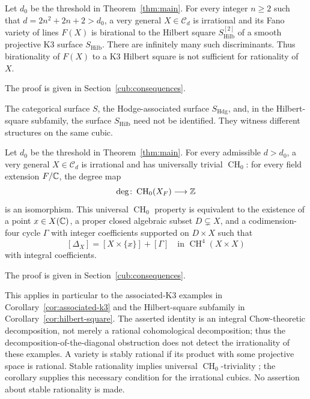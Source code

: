\begin{corollary}\label{cor:hilbert-square}
Let \(d_0\) be the threshold in Theorem~\ref{thm:main}. For every integer
\(n\ge2\) such that \(d=2n^2+2n+2>d_0\), a very general
\(X\in\mathcal C_d\) is irrational and its Fano variety of lines \(F(X)\)
is birational to the Hilbert square \(S_{\mathrm{Hilb}}^{[2]}\) of a smooth
projective K3 surface \(S_{\mathrm{Hilb}}\). There are infinitely many such
discriminants. Thus birationality of \(F(X)\) to a K3 Hilbert square is
not sufficient for rationality of \(X\).
\end{corollary}

The proof is given in Section~\ref{cub:consequences}.

The categorical surface \(S\), the Hodge-associated surface
\(S_{\mathrm{Hdg}}\), and, in the Hilbert-square subfamily, the surface
\(S_{\mathrm{Hilb}}\) need not be identified. They witness different
structures on the same cubic.

\begin{corollary}
\label{cor:chow-diagonal}
Let \(d_0\) be the threshold in Theorem~\ref{thm:main}. For every admissible
\(d>d_0\), a very general \(X\in\mathcal C_d\) is irrational and has
universally trivial \(\operatorname{CH}_0\): for every field extension
\(F/\mathbb C\), the degree map
\[
 \deg\colon\operatorname{CH}_0(X_F)\longrightarrow\mathbb Z
\]
is an isomorphism. This universal \(\operatorname{CH}_0\) property is
equivalent to the existence of a point \(x\in X(\mathbb C)\), a proper closed
algebraic subset \(D\subsetneq X\), and a codimension-four cycle \(\Gamma\)
with integer coefficients supported on \(D\times X\) such that
\[
 [\Delta_X]=[X\times\{x\}]+[\Gamma]
 \quad\text{in }\operatorname{CH}^4(X\times X)
\]
with integral coefficients.
\end{corollary}

The proof is given in Section~\ref{cub:consequences}.

This applies in particular to the associated-K3 examples in
Corollary~\ref{cor:associated-k3} and the Hilbert-square subfamily in
Corollary~\ref{cor:hilbert-square}. The asserted identity is an integral
Chow-theoretic decomposition, not merely a rational cohomological
decomposition; thus the decomposition-of-the-diagonal obstruction does not
detect the irrationality of these examples. A variety is stably rational
if its product with some projective space is rational. Stable rationality
implies universal \(\operatorname{CH}_0\)-triviality \cite{Voisin17}; the
corollary supplies this necessary condition for the irrational cubics.
No assertion about stable rationality is made.

